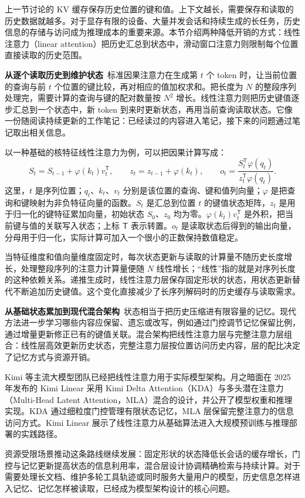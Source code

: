 上一节讨论的 KV 缓存保存历史位置的键和值。上下文越长，需要保存和读取的历史数据就越多。对于显存有限的设备、大量并发会话和持续生成的长任务，历史信息的存储与访问成为推理成本的重要来源。本节介绍两种降低开销的方式：线性注意力（linear attention）把历史汇总到状态中，滑动窗口注意力则限制每个位置直接读取的历史范围。

\textbf{从逐个读取历史到维护状态}~标准因果注意力在生成第 $t$ 个 token 时，让当前位置的查询与前 $t$ 个位置的键比较，再对相应的值加权求和。把长度为 $N$ 的整段序列处理完，需要计算的查询与键的配对数量按 $N^2$ 增长。线性注意力则把历史键值逐步汇总到一个状态中，新 token 到来时更新状态，再用当前查询读取状态。它像一份随阅读持续更新的工作笔记：已经读过的内容进入笔记，接下来的问题通过笔记取出相关信息。

以一种基础的核特征线性注意力为例，可以把因果计算写成：
\[
S_t=S_{t-1}+\varphi(k_t)v_t^{\mathsf T},\qquad
z_t=z_{t-1}+\varphi(k_t),\qquad
 o_t=\frac{S_t^{\mathsf T}\varphi(q_t)}{z_t^{\mathsf T}\varphi(q_t)}.
\]
这里，$t$ 是序列位置；$q_t$、$k_t$、$v_t$ 分别是该位置的查询、键和值列向量；$\varphi$ 是把查询和键映射为非负特征向量的函数。$S_t$ 是汇总到位置 $t$ 的键值状态矩阵，$z_t$ 是用于归一化的键特征累加向量，初始状态 $S_0$、$z_0$ 均为零。$\varphi(k_t)v_t^{\mathsf T}$ 是外积，把当前键与值的关联写入状态；上标 $\mathsf T$ 表示转置。$o_t$ 是读取状态后得到的输出向量，分母用于归一化，实际计算可加入一个很小的正数保持数值稳定。

当特征维度和值向量维度固定时，每次状态更新与读取的计算量不随历史长度增长，处理整段序列的注意力计算量便随 $N$ 线性增长；``线性''指的就是对序列长度的这种依赖关系。递推生成时，线性注意力层保存固定形状的状态，用状态更新替代不断追加历史键值。这个变化直接减少了长序列解码时的历史缓存与读取需求。

\textbf{从基础状态累加到现代混合架构}~状态相当于把历史压缩进有限容量的记忆。现代方法进一步学习哪些内容应保留、遗忘或改写，例如通过门控调节记忆保留比例，通过增量更新修正已有的键值关联。混合架构把线性注意力层与完整注意力层组合：线性层高效更新历史状态，完整注意力层按位置访问历史内容，层的配比决定了记忆方式与资源开销。

Kimi 等主流大模型团队已经把线性注意力用于实际模型架构。月之暗面在 2025 年发布的 Kimi Linear 采用 Kimi Delta Attention（KDA）与多头潜在注意力（Multi-Head Latent Attention，MLA）混合的设计，并公开了模型权重和推理实现。KDA 通过细粒度门控管理有限状态记忆，MLA 层保留完整注意力的信息访问方式。Kimi Linear 展示了线性注意力从基础算法进入大规模预训练与推理部署的实践路径。

资源受限场景推动这条路线继续发展：固定形状的状态降低长会话的缓存增长，门控与记忆更新提高状态的信息利用率，混合层设计协调精确检索与持续计算。对于需要处理长文档、维护多轮工具轨迹或同时服务大量用户的模型，历史信息怎样进入记忆、记忆怎样被读取，已经成为模型架构设计的核心问题。

